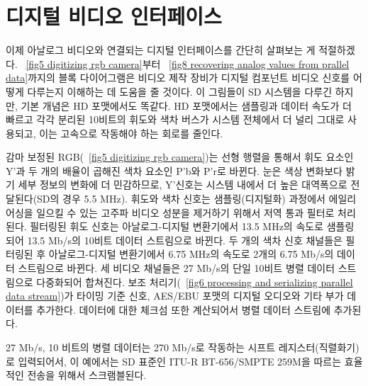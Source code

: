 \chapter{디지털 비디오 인터페이스}
이제 아날로그 비디오와 연결되는 디지털 인터페이스를 간단히 살펴보는 게 적절하겠다.
\figurename~\ref{fig5 digitizing rgb camera}부터 \figurename~\ref{fig8 recovering analog values from prallel data}까지의 블록 다이어그램은 비디오 제작 장비가 디지털 컴포넌트 비디오 신호를 어떻게 다루는지 이해하는 데 도움을 줄 것이다.
이 그림들이 SD 시스템을 다루긴 하지만, 기본 개념은 HD 포맷에서도 똑같다. HD 포맷에서는 샘플링과 데이터 속도가 더 빠르고 각각 분리된 10비트의 휘도와 색차 버스가 시스템 전체에서 더 널리 그대로 사용되고, 이는 고속으로 작동해야 하는 회로를 줄인다.

감마 보정된 RGB(\figurename~\ref{fig5 digitizing rgb camera})는 선형 행렬을 통해서 휘도 요소인 Y'과 두 개의 배율이 곱해진 색차 요소인 P'b와 P'r로 바뀐다.
눈은 색상 변화보다 밝기 세부 정보의 변화에 더 민감하므로, Y'신호는 시스템 내에서 더 높은 대역폭으로 전달된다(SD의 경우 5.5 MHz).
휘도와 색차 신호는 샘플링(디지털화) 과정에서 에일리어싱을 일으킬 수 있는 고주파 비디오 성분을 제거하기 위해서 저역 통과 필터로 처리된다.
필터링된 휘도 신호는 아날로그-디지털 변환기에서 13.5 MHz의 속도로 샘플링되어 13.5 Mb/s의 10비트 데이터 스트림으로 바뀐다.
두 개의 색차 신호 채널들은 필터링된 후 아날로그-디지털 변환기에서 6.75 MHz의 속도로 2개의 6.75 Mb/s의 데이터 스트림으로 바뀐다.
세 비디오 채널들은 27 Mb/s의 단일 10비트 병렬 데이터 스트림으로 다중화되어 합쳐진다.
보조 처리기(\figurename~\ref{fig6 processing and serializing parallel data stream})가 타이밍 기준 신호, AES/EBU 포맷의 디지털 오디오와 기타 부가 데이터를 추가한다. 데이터에 대한 체크섬 또한 계산되어서 병렬 데이터 스트림에 추가된다.

27 Mb/s, 10 비트의 병렬 데이터는 270 Mb/s로 작동하는 시프트 레지스터(직렬화기)로 입력되어서, 이 예에서는 SD 표준인 ITU-R BT-656/SMPTE 259M을 따르는 효율적인 전송을 위해서 스크램블된다.

